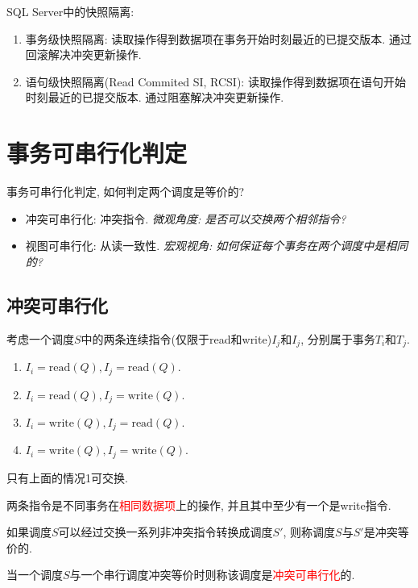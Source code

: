 SQL Server中的快照隔离:
\begin{enumerate}
    \item 事务级快照隔离: 读取操作得到数据项在事务开始时刻最近的已提交版本. 通过回滚解决冲突更新操作.
    \item 语句级快照隔离(Read Commited SI, RCSI): 读取操作得到数据项在语句开始时刻最近的已提交版本. 通过阻塞解决冲突更新操作.
\end{enumerate}

\section{事务可串行化判定}

事务可串行化判定, 如何判定两个调度是等价的?
\begin{itemize}
  \item 冲突可串行化: 冲突指令. \textit{微观角度: 是否可以交换两个相邻指令?}
  \item 视图可串行化: 从读一致性. \textit{宏观视角: 如何保证每个事务在两个调度中是相同的?}
\end{itemize}

\subsection{冲突可串行化}

考虑一个调度$S$中的两条连续指令(仅限于read和write)$I_j$和$I_j$, 分别属于事务$T_i$和$T_j$.
\begin{enumerate}
    \item $I_i=\text{read}(Q), I_j=\text{read}(Q)$.
    \item $I_i=\text{read}(Q), I_j=\text{write}(Q)$.
    \item $I_i=\text{write}(Q), I_j=\text{read}(Q)$.
    \item $I_i=\text{write}(Q), I_j=\text{write}(Q)$.
\end{enumerate}

只有上面的情况1可交换.

\begin{definition}[冲突指令]
  两条指令是不同事务在\textcolor{red}{相同数据项}上的操作, 并且其中至少有一个是write指令.
\end{definition}

\begin{definition}[冲突等价]
  如果调度$S$可以经过交换一系列非冲突指令转换成调度$S'$, 则称调度$S$与$S'$是冲突等价的.
\end{definition}

\begin{definition}[冲突可串行化]
  当一个调度$S$与一个串行调度冲突等价时则称该调度是\textcolor{red}{冲突可串行化}的.
\end{definition}

